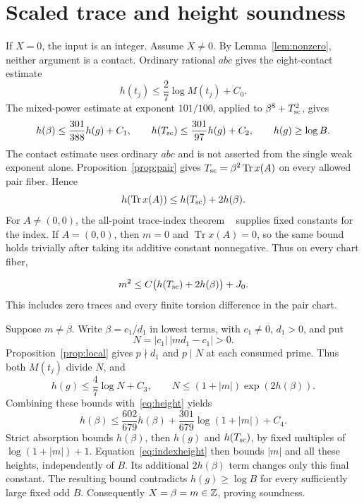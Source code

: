 \documentclass[11pt,a4paper]{article}
\DeclareMathOperator{\Tr}{Tr}\DeclareMathOperator{\Nm}{Nm}
\begin{document}
\section{Scaled trace and height soundness}
If $X=0$, the input is an integer. Assume $X\ne0$.
By Lemma~\ref{lem:nonzero}, neither argument is a contact.
Ordinary rational $abc$ gives the eight-contact estimate
\cite[Section~2]{Height}
\[
                    h(t_j)\le\frac27\log M(t_j)+C_0.
\]
The mixed-power estimate at exponent $101/100$, applied to
$\beta^8+T_{\rm sc}^2$, gives
\begin{equation}\label{eq:height}
 h(\beta)\le\frac{301}{388}h(g)+C_1,\qquad
 h(T_{\rm sc})\le\frac{301}{97}h(g)+C_2,\qquad h(g)\ge\log B.
\end{equation}
The contact estimate uses ordinary $abc$ and is not asserted from
the single weak exponent alone. Proposition~\ref{prop:pair} gives
$T_{\rm sc}=\beta^2\Tr x(A)$ on every allowed pair fiber. Hence
\[
              h(\Tr x(A))\le h(T_{\rm sc})+2h(\beta).
\]
For $A\ne(0,0)$, the all-point trace-index theorem
~\cite[Corollary~1.3]{Trace} supplies fixed constants for the index.
If $A=(0,0)$, then $m=0$ and $\Tr x(A)=0$, so the same bound
holds trivially after taking its additive constant nonnegative.
Thus on every chart fiber,

\begin{equation}\label{eq:indexheight}
              m^2\le C\bigl(h(T_{\rm sc})+2h(\beta)\bigr)+J_0.
\end{equation}
This includes zero traces and every finite torsion difference in
the pair chart.

Suppose $m\ne\beta$. Write $\beta=c_1/d_1$ in lowest terms,
with $c_1\ne0$, $d_1>0$, and put
\[
                         N=|c_1|\,|md_1-c_1|>0.
\]
Proposition~\ref{prop:local} gives $p\nmid d_1$ and $p\mid N$
at each consumed prime. Thus both $M(t_j)$ divide $N$, and
\[
 h(g)\le\frac47\log N+C_3,\qquad
               N\le(1+|m|)\exp(2h(\beta)).
\]
Combining these bounds with~\eqref{eq:height} yields
\[
 h(\beta)\le\frac{602}{679}h(\beta)
        +\frac{301}{679}\log(1+|m|)+C_4.
\]
Strict absorption bounds $h(\beta)$, then $h(g)$ and
$h(T_{\rm sc})$, by fixed multiples of $\log(1+|m|)+1$.
Equation~\eqref{eq:indexheight} then bounds $|m|$ and all these
heights, independently of $B$. Its additional $2h(\beta)$ term
changes only this final constant. The resulting bound contradicts
$h(g)\ge\log B$ for every sufficiently large fixed odd $B$.
Consequently $X=\beta=m\in\mathbb Z$, proving soundness.
\end{document}
